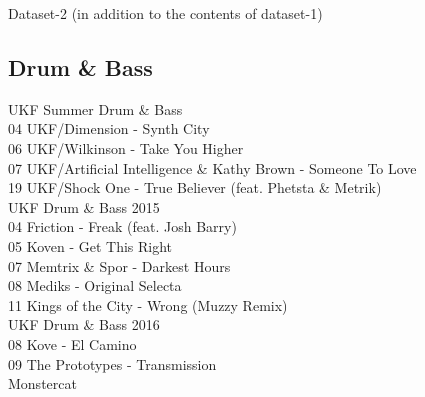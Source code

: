 \huge Dataset-2 (in addition to the contents of dataset-1) \normalsize\\

\begin{multicols}{2}
 \section*{Drum \& Bass}
 \large UKF Summer Drum \& Bass \normalsize\\
 04 UKF/Dimension - Synth City\\ 06 UKF/Wilkinson - Take You Higher\\ 07 UKF/Artificial Intelligence \& Kathy Brown - Someone To Love\\ 19 UKF/Shock One - True Believer (feat. Phetsta \& Metrik)\\
 \large UKF Drum \& Bass 2015 \normalsize\\
 04 Friction - Freak (feat. Josh Barry)\\ 05 Koven - Get This Right\\ 07 Memtrix \& Spor - Darkest Hours\\ 08 Mediks - Original Selecta\\ 11 Kings of the City - Wrong (Muzzy Remix)\\
 \large UKF Drum \& Bass 2016 \normalsize\\
 08 Kove - El Camino\\ 09 The Prototypes - Transmission\\
 \large Monstercat \normalsize\\

\end{multicols}
